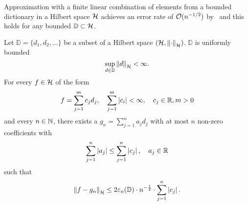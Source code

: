 Approximation with a finite linear combination of elements from a bounded
dictionary in a Hilbert space $\mathcal{H}$ achieves an error rate of
$\mathcal{O}(n^{-1/2})$ by~\cite{pisierRemarquesResultatNon1980} and this holds for
any bounded $\mathbb{D} \subset \mathcal{H}$.

\begin{theorem}
    \label{thm:maurey}
    Let $\mathbb{D} = \{d_1, d_2, \dots\}$ be a subset of a Hilbert space
    $(\mathcal{H}, \left\| \cdot \right\|_{\mathcal{H}})$. $\mathbb{D}$ is uniformly bounded
    \begin{equation}
        \sup_{d\in\mathbb{D}} \left\| d \right\|_{\mathcal{H}} < \infty.
    \end{equation}
    For every $f \in \mathcal{H}$ of the form
    \begin{equation}
        \label{eq:maurey_eq_1}
        f = \sum_{j=1}^m c_j d_j, \quad
        \sum_{j=1}^m \left| c_i \right| < \infty, \quad
        c_j \in \mathbb{R}, m > 0
    \end{equation}
    and every $n \in \mathbb{N}$, there exists a $g_n = \sum_{j=1}^n a_j
    d_j$ with at most $n$ non-zero coefficients with
    \begin{equation}
        \sum_{j=1}^n \left| a_j \right| \leq
        \sum_{j=1}^n \left| c_j \right|, 
        \quad a_j \in \mathbb{R}
    \end{equation}
    such that
    \begin{equation}
        \left\| f - g_n \right\|_{\mathcal{H}} \leq
        2 \varepsilon_{n}({\mathbb{D}})
        \cdot n^{-\frac{1}{2}}
        \cdot \sum_{j=1}^n \left| c_j \right|.
    \end{equation}

\end{theorem}

